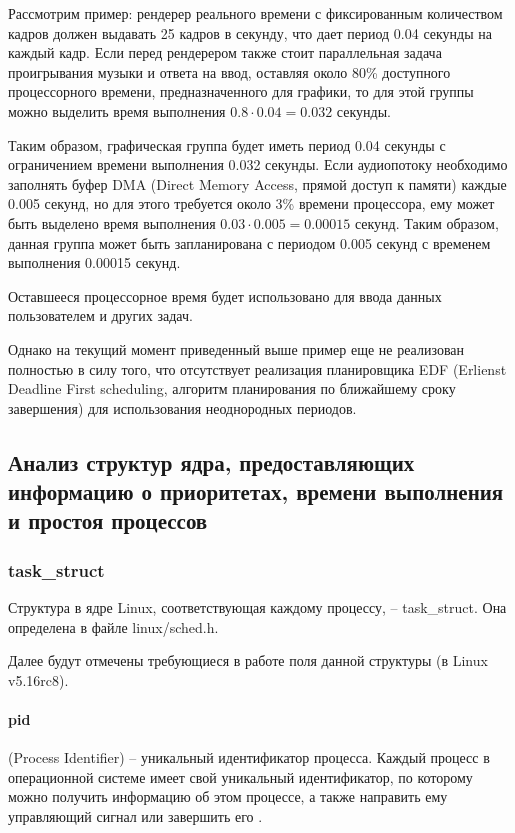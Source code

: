 Рассмотрим пример: рендерер реального времени с фиксированным количеством кадров должен выдавать 25 кадров в секунду, что дает период 0.04 секунды на каждый кадр. Если перед рендерером также стоит параллельная задача проигрывания музыки и ответа на ввод, оставляя около 80\% доступного процессорного времени, предназначенного для графики, то для этой группы можно выделить время выполнения $ 0.8 \cdot 0.04 = 0.032 $ секунды.

Таким образом, графическая группа будет иметь период 0.04 секунды с ограничением времени выполнения 0.032 секунды. Если аудиопотоку необходимо заполнять буфер DMA (Direct Memory Access, прямой доступ к памяти) каждые 0.005 секунд, но для этого требуется около 3\% времени процессора, ему может быть выделено время выполнения $ 0.03 \cdot 0.005 = 0.00015 $ секунд. Таким образом, данная группа может быть запланирована с периодом 0.005 секунд с временем выполнения 0.00015 секунд.

Оставшееся процессорное время будет использовано для ввода данных пользователем и других задач.

Однако на текущий момент приведенный выше пример еще не реализован полностью в силу того, что отсутствует реализация планировщика EDF (Erlienst Deadline First scheduling, алгоритм планирования по ближайшему сроку завершения) для использования неоднородных периодов. \cite{linuxkerneldocs}

\subsection{Анализ структур ядра, предоставляющих информацию о приоритетах, времени выполнения и простоя процессов }
\subsubsection{task\_struct}

Структура в ядре Linux, соответствующая каждому процессу, -- task\_struct. Она определена в файле linux/sched.h. \cite{linuxTasks}

Далее будут отмечены требующиеся в работе поля данной структуры (в Linux v5.16rc8).

\paragraph*{pid} (Process Identifier) -- уникальный идентификатор процесса. Каждый процесс в операционной системе имеет свой уникальный идентификатор, по которому можно получить информацию об этом процессе, а также направить ему управляющий сигнал или завершить его \cite{losst}.

